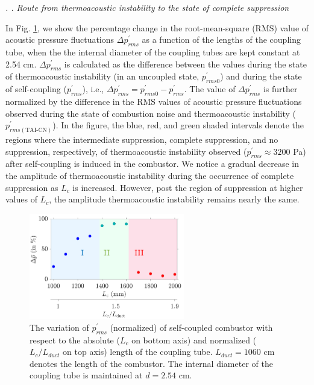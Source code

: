 \documentclass[twocolumn,10pt]{article} %
\renewcommand{\subsection}%
              [1]%
              {%
               \bgroup%
               \flushleft%
               \small\em%
               \stepcounter{subsection}%
               \arabic{section}.%
               \arabic{subsection}. #1%
               \par%
               \egroup%
              }%
\begin{document}
\subsection{Route from thermoacoustic instability to the state of complete suppression} \addvspace{10pt}

In Fig. \ref{fig2}, we show the percentage change in the root-mean-square (RMS) value of acoustic pressure fluctuations $\Delta p^\prime_{rms}$ as a function of the lengths of the coupling tube, when the the internal diameter of the coupling tubes are kept constant at 2.54 cm. $\Delta p^\prime_{rms}$ is calculated as the difference between the values during the state of thermoacoustic instability (in an uncoupled state, $p^\prime_{rms0}$) and during the state of self-coupling ($p^\prime_{rms}$), i.e., $\Delta p^\prime_{rms} = p^\prime_{rms0}-p^\prime_{rms}$. The value of $\Delta p^\prime_{rms}$ is further normalized by the difference in the RMS values of acoustic pressure fluctuations observed during the state of combustion noise and thermoacoustic instability ($p^\prime_{rms(\text{TAI-CN})}$). %
In the figure, the blue, red, and green shaded intervals denote the regions where the intermediate suppression, complete suppression, and no suppression, respectively, of thermoacoustic instability observed ($p^\prime_{rms}  \approx 3200$ Pa) after self-coupling is induced in the combustor. We notice a gradual decrease in the amplitude of thermoacoustic instability during the occurrence of complete suppression as $L_c$ is increased. However, post the region of suppression at higher values of $L_c$, the amplitude thermoacoustic instability remains nearly the same. 

\begin{figure}[t]
\centering
\includegraphics[width=192pt]{fig2.png}
\caption{The variation of $p^\prime_{rms}$ (normalized) of self-coupled combustor with respect to the absolute ($L_c$ on bottom axis) and normalized ($L_c/L_{duct}$ on top axis) length of the coupling tube. $L_{duct} = 1060$ cm denotes the length of the combustor. The internal diameter of the coupling tube is maintained at $d=2.54$ cm. }
\label{fig2}
\end{figure}
\end{document}
